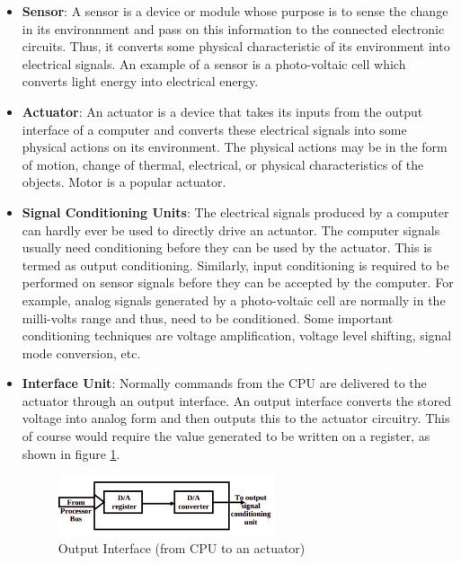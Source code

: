 \documentclass[12pt]{report}
\begin{document}
\begin{itemize}
    \item \textbf{Sensor}: A sensor is a device or module whose purpose is to sense the change in its environnment and pass on this information to the connected electronic circuits. Thus,  it converts some physical characteristic of its environment into electrical signals. An example of a sensor is a photo-voltaic cell which converts light energy into electrical energy.
    \item \textbf{Actuator}: An actuator is a device that takes its inputs from the output interface of a computer and converts these electrical signals into some physical actions on its environment. The physical actions may be in the form of motion, change of thermal, electrical, or physical characteristics of the objects. Motor is a popular actuator.
    \item \textbf{Signal Conditioning Units}: The electrical signals produced by a computer can hardly ever be used to directly drive an actuator. The computer signals usually need conditioning before they can be used by the actuator. This is termed as output conditioning. Similarly, input conditioning is required to be performed on sensor signals before they can be accepted by the computer. For example, analog signals generated by a photo-voltaic cell are normally in the milli-volts range and thus, need to be conditioned. Some important conditioning techniques are voltage amplification, voltage level shifting, signal mode conversion, etc. 
    \item \textbf{Interface Unit}: Normally commands from the CPU are delivered to the actuator through an output interface. An output interface converts the stored voltage into analog form and then outputs this to the actuator circuitry. This of course would require the value generated to be written on a register, as shown in figure \ref{fig:output}. 
    \begin{figure}[h]
    \centering
    \includegraphics[width=0.6\textwidth]{images/output-interface.png}
    \caption{Output Interface (from CPU to an actuator)}
    \label{fig:output}
    \end{figure}
\end{itemize}
\end{document}
